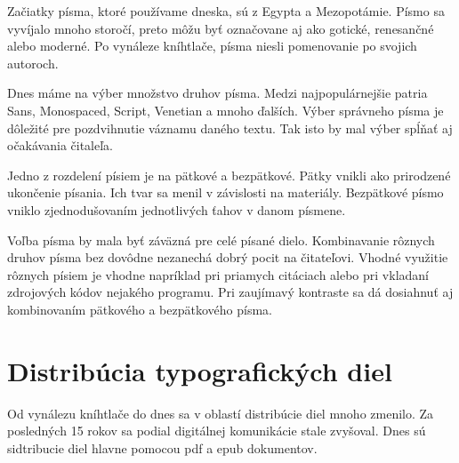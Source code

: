 \documentclass[a4paper, 11pt]{article}
\begin{document}
Začiatky písma, ktoré používame dneska, sú z Egypta a Mezopotámie. Písmo sa vyvíjalo mnoho storočí, preto môžu byť označovane aj ako gotické, renesančné alebo moderné.  Po vynáleze kníhtlače, písma niesli pomenovanie po svojich autoroch.\cite{znaksad}

Dnes máme na výber množstvo druhov písma. Medzi najpopulárnejšie patria Sans, Monospaced, Script, Venetian a mnoho ďalších. Výber správneho písma je dôležité pre pozdvihnutie váznamu daného textu. Tak isto by mal výber spĺňať aj očakávania čitaleľa. \cite {destype}

Jedno z rozdelení písiem je na pätkové a bezpätkové. Pätky vnikli ako prirodzené ukončenie písania. Ich tvar sa menil v závislosti na materiály. Bezpätkové písmo vniklo zjednodušovaním jednotlivých ťahov v danom písmene. \cite{basics}

Voľba písma by mala byť záväzná pre celé písané dielo. Kombinavanie rôznych druhov písma bez dovôdne nezanechá dobrý pocit na čitateľovi. Vhodné využitie rôznych písiem je vhodne napríklad pri priamych citáciach alebo pri vkladaní zdrojových kódov nejakého programu. Pri zaujímavý kontraste sa dá dosiahnuť aj kombinovaním pätkového a bezpätkového písma. \cite{combfont} 

\section{Distribúcia typografických diel}
Od vynálezu kníhtlače do dnes sa v oblastí distribúcie diel mnoho zmenilo. Za posledných 15 rokov sa podial digitálnej komunikácie stale zvyšoval. \cite{tlac} Dnes sú sidtribucie diel hlavne pomocou pdf a epub dokumentov.


\pagebreak

\renewcommand{\refname}{Literatúra}

\end{document}
